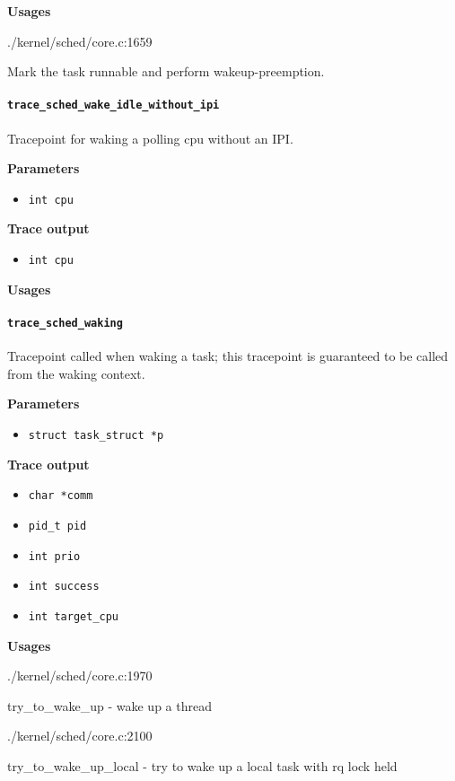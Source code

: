 \textbf{Usages}
\begin{code}
./kernel/sched/core.c:1659
\end{code}
Mark the task runnable and perform wakeup-preemption.
  
\paragraph{\texttt{trace\_sched\_wake\_idle\_without\_ipi}}
Tracepoint for waking a polling cpu without an IPI.

\textbf{Parameters}
\begin{itemize}
    \item \verb|int cpu|
\end{itemize}

\textbf{Trace output}
\begin{itemize}
    \item \verb|int cpu|
\end{itemize}

\textbf{Usages}
\begin{code}

\end{code}

\paragraph{\texttt{trace\_sched\_waking}}
Tracepoint called when waking a task; this tracepoint is guaranteed to be called from the waking context.

\textbf{Parameters}
\begin{itemize}
    \item \verb|struct task_struct *p|
\end{itemize}

\textbf{Trace output}
\begin{itemize}
    \item \verb|char *comm|
    \item \verb|pid_t pid|
    \item \verb|int prio|
    \item \verb|int success|
    \item \verb|int target_cpu|
\end{itemize}

\textbf{Usages}
\begin{code}
./kernel/sched/core.c:1970
\end{code}
try\_to\_wake\_up - wake up a thread
\begin{code}
./kernel/sched/core.c:2100
\end{code}
try\_to\_wake\_up\_local - try to wake up a local task with rq lock held

